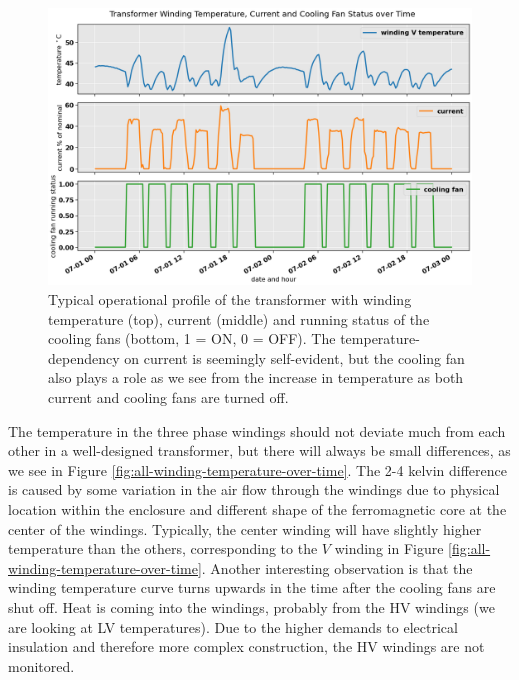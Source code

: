 \documentclass[]{article}
\begin{document}
\begin{figure}[!h]
	\centering
	\includegraphics[width=1\linewidth]{./figs/temp-current-aux.png}
	\caption{Typical operational profile of the transformer with winding temperature (top), current (middle) and running status of the cooling fans (bottom, 1 = ON, 0 = OFF). The temperature-dependency on current is seemingly self-evident, but the cooling fan also plays a role as we see from the increase in temperature as both current and cooling fans are turned off.}
	\label{fig:temp-current-aux}
\end{figure}

The temperature in the three phase windings should not deviate much from each other in a well-designed transformer, but there will always be small differences, as we see in Figure \ref{fig:all-winding-temperature-over-time}. The 2-4 kelvin difference is caused by some variation in the air flow through the windings due to physical location within the enclosure and different shape of the ferromagnetic core at the center of the windings. Typically, the center winding will have slightly higher temperature than the others, corresponding to the $V$ winding in Figure \ref{fig:all-winding-temperature-over-time}. Another interesting observation is that the winding temperature curve turns upwards in the time after the cooling fans are shut off. Heat is coming into the windings, probably from the HV windings (we are looking at LV temperatures). Due to the higher demands to electrical insulation and therefore more complex construction, the HV windings are not monitored.
\end{document}
